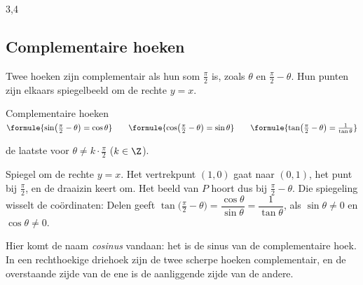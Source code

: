 \begin{alleenvoor}{3,4}
\subsection{Complementaire hoeken}

Twee hoeken zijn complementair als hun som $\frac{\pi}{2}$ is, zoals $\theta$ en $\frac{\pi}{2} - \theta$. Hun punten zijn elkaars spiegelbeeld om de rechte $y = x$.

\begin{theorie}
\begin{stelling}{Complementaire hoeken}
\qquad $\formule{\sin\bigl(\tfrac{\pi}{2} - \theta\bigr) = \cos\theta} \qquad \formule{\cos\bigl(\tfrac{\pi}{2} - \theta\bigr) = \sin\theta} \qquad \formule{\tan\bigl(\tfrac{\pi}{2} - \theta\bigr) = \frac{1}{\tan\theta}}$

\vspace{1mm}
de laatste voor $\theta \neq k \cdot \frac{\pi}{2}$ ($k \in \Z$).
\end{stelling}
\begin{bewijs}
Spiegel om de rechte $y = x$. Het vertrekpunt $(1, 0)$ gaat naar $(0, 1)$, het punt bij $\frac{\pi}{2}$, en de draaizin keert om. Het beeld van $P$ hoort dus bij $\frac{\pi}{2} - \theta$. Die spiegeling wisselt de coördinaten:
Delen geeft $\tan\bigl(\frac{\pi}{2} - \theta\bigr) = \dfrac{\cos\theta}{\sin\theta} = \dfrac{1}{\tan\theta}$, als $\sin\theta \neq 0$ en $\cos\theta \neq 0$.
\end{bewijs}
\end{theorie}

Hier komt de naam \textit{cosinus} vandaan: het is de sinus van de complementaire hoek. In een rechthoekige driehoek zijn de twee scherpe hoeken complementair, en de overstaande zijde van de ene is de aanliggende zijde van de andere.


\begin{oefeningen}
\end{oefeningen}

\end{alleenvoor}
